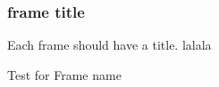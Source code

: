 \newcommand\here{lalala}
\begin{frame}
  \frametitle{frame title}
  Each frame should have a title.
\here
\end{frame}



\begin{frame}{Test for Frame name}

\end{frame}
